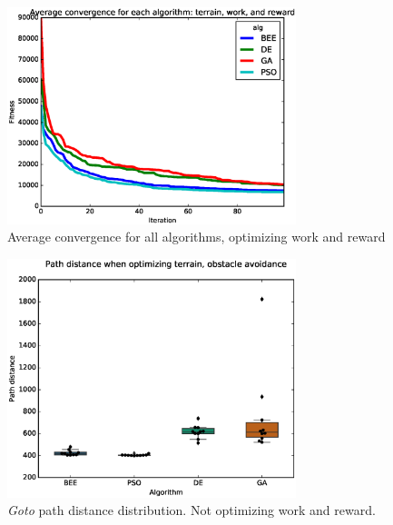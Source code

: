 \documentclass{tamuccthesis}
\begin{document}
\begin{figure}[H]
    \captionsetup{justification=centering}
    \centering
        \includegraphics[width=0.75\textwidth,trim={0cm 0.75cm 0cm 0.75cm},clip]{conv_avg_b.eps}
    \caption{Average convergence for all algorithms, optimizing work and reward}
    \label{fig:convergence_b_avg}
\end{figure}




\begin{figure}[H]
    \captionsetup{justification=centering}
    \centering
    \includegraphics[width=0.75\textwidth,trim={0cm 0.75cm 0cm 0.75cm},clip]{EXP3_histo_distance_a.eps}
    \caption{\textit{Goto} path distance distribution. Not optimizing work and reward. }
    \label{fig:algcompare_a_distance}
\end{figure}
\end{document}
